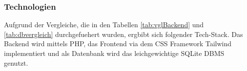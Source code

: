 \subsubsection{Technologien}
Aufgrund der Vergleiche, die in den Tabellen \ref{tab:vglBackend} und \ref{tab:dbvergleich} durchgefuehert wurden, ergbibt sich folgender Tech-Stack.
Das Backend wird mittels PHP, das Frontend via dem CSS Framework Tailwind implementiert und als Datenbank wird das leichgewichtige SQLite DBMS genutzt.
